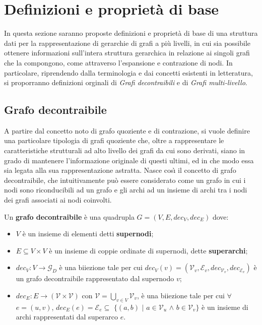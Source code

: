 \section{Definizioni e propriet\`a di base}\label{sec:definizioni-e-proprieta-di-base}

In questa sezione saranno proposte definizioni e propriet\`a di base di una struttura dati per la rappresentazione
di gerarchie di grafi a pi\`u livelli, in cui sia possibile ottenere informazioni sull'intera struttura gerarchica in
relazione ai singoli grafi che la compongono, come attraverso l'espansione e contrazione di nodi.
In particolare, riprendendo dalla terminologia e dai concetti esistenti in letteratura, si proporranno definizioni
orginali di \textit{Grafi decontraibili} e di \textit{Grafi multi-livello}.

\subsection{Grafo decontraibile}

    A partire dal concetto noto di grafo quoziente e di contrazione, si vuole definire una particolare
    tipologia di grafi quoziente che, oltre a rappresentare le caratteristiche strutturali ad alto livello
    dei grafi da cui sono derivati, siano in grado di mantenere l'informazione originale di questi ultimi, ed in
    che modo essa sia legata alla sua rappresentazione astratta. \newline
    Nasce cos\`{\i} il concetto di grafo decontraibile, che intuitivamente pu\`o essere considerato come un grafo
    in cui i nodi sono riconducibili ad un grafo e gli archi ad un insieme di archi tra i nodi dei grafi
    associati ai nodi coinvolti. \newline

    \begin{definition}
        Un \textbf{grafo decontraibile} \`e una quadrupla $G = (V, E, dec_V, dec_E)$ dove:
        \begin{itemize}
            \item $V$ \`e un insieme di elementi detti \textbf{supernodi};
            \item $E \subseteq V \times V$ \`e un insieme di coppie ordinate di supernodi, dette \textbf{superarchi};
            \item $dec_V : V \rightarrow \mathcal{G}_D$ \`e una biiezione tale per cui $dec_V(v) = (\mathcal{V}_v,
                \mathcal{E}_v, dec_{\mathcal{V}_v}, dec_{\mathcal{E}_v})$ \`e un grafo decontraibile rappresentato
                dal supernodo $v$;
            \item $dec_E : E \rightarrow (\mathcal{V} \times \mathcal{V})$ con $\mathcal{V} = \bigcup_{v \in V}\mathcal{V}_v$,
                \`e una biiezione tale per cui $\forall$ $ e = (u, v)$, $dec_E(e) = \mathcal{E}_e \subseteq$ $\{(a, b)$ $\mid$ $a \in \mathcal{V}_u$ $\wedge$
                $b \in \mathcal{V}_v\}$ \`e un insieme di archi rappresentati dal superarco $e$.
        \end{itemize}
    \end{definition}

